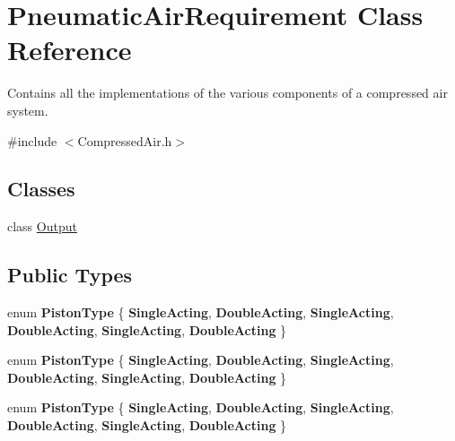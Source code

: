 \hypertarget{class_pneumatic_air_requirement}{}\section{Pneumatic\+Air\+Requirement Class Reference}
\label{class_pneumatic_air_requirement}


Contains all the implementations of the various components of a compressed air system.  




{\ttfamily \#include $<$Compressed\+Air.\+h$>$}

\subsection*{Classes}
\begin{DoxyCompactItemize}
\item 
class \hyperlink{class_pneumatic_air_requirement_1_1_output}{Output}
\end{DoxyCompactItemize}
\subsection*{Public Types}
\begin{DoxyCompactItemize}
\item 
\mbox{\label{class_pneumatic_air_requirement_aa43374a59756771200d03c6e5aeffe1c}} 
enum {\bfseries Piston\+Type} \{ \newline
{\bfseries Single\+Acting}, 
{\bfseries Double\+Acting}, 
{\bfseries Single\+Acting}, 
{\bfseries Double\+Acting}, 
\newline
{\bfseries Single\+Acting}, 
{\bfseries Double\+Acting}
 \}
\item 
\mbox{\label{class_pneumatic_air_requirement_aa43374a59756771200d03c6e5aeffe1c}} 
enum {\bfseries Piston\+Type} \{ \newline
{\bfseries Single\+Acting}, 
{\bfseries Double\+Acting}, 
{\bfseries Single\+Acting}, 
{\bfseries Double\+Acting}, 
\newline
{\bfseries Single\+Acting}, 
{\bfseries Double\+Acting}
 \}
\item 
\mbox{\label{class_pneumatic_air_requirement_aa43374a59756771200d03c6e5aeffe1c}} 
enum {\bfseries Piston\+Type} \{ \newline
{\bfseries Single\+Acting}, 
{\bfseries Double\+Acting}, 
{\bfseries Single\+Acting}, 
{\bfseries Double\+Acting}, 
\newline
{\bfseries Single\+Acting}, 
{\bfseries Double\+Acting}
 \}
\end{DoxyCompactItemize}
